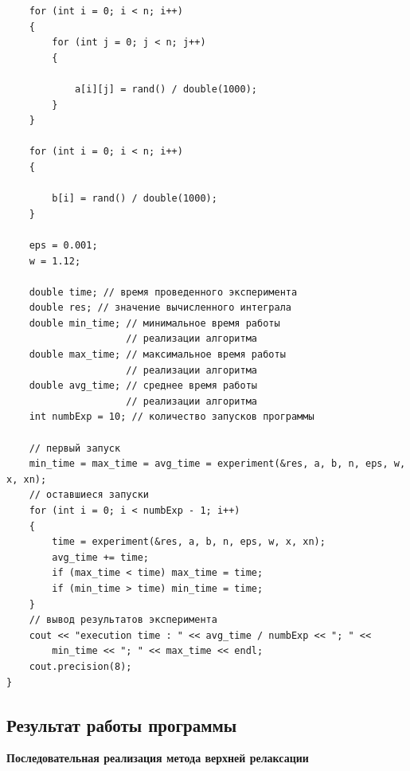 \documentclass[bachelor, och, referat]{SCWorks}
\begin{document}
\begin{verbatim}
	for (int i = 0; i < n; i++)
	{
		for (int j = 0; j < n; j++)
		{

			a[i][j] = rand() / double(1000);
		}
	}

	for (int i = 0; i < n; i++)
	{

		b[i] = rand() / double(1000);
	}

	eps = 0.001;
	w = 1.12;

	double time; // время проведенного эксперимента
	double res; // значение вычисленного интеграла
	double min_time; // минимальное время работы
					 // реализации алгоритма
	double max_time; // максимальное время работы
					 // реализации алгоритма
	double avg_time; // среднее время работы
					 // реализации алгоритма
	int numbExp = 10; // количество запусков программы

	// первый запуск
	min_time = max_time = avg_time = experiment(&res, a, b, n, eps, w, x, xn);
	// оставшиеся запуски
	for (int i = 0; i < numbExp - 1; i++)
	{
		time = experiment(&res, a, b, n, eps, w, x, xn);
		avg_time += time;
		if (max_time < time) max_time = time;
		if (min_time > time) min_time = time;
	}
	// вывод результатов эксперимента
	cout << "execution time : " << avg_time / numbExp << "; " <<
		min_time << "; " << max_time << endl;
	cout.precision(8);
}
\end{verbatim}




\newpage
\subsection{Результат работы программы}

\textbf{Последовательная реализация метода верхней релаксации}
\begin{figure}[h]
\end{figure}

\begin{figure}[h]
\end{figure}

\begin{figure}[h]
\end{figure}
\end{document}
